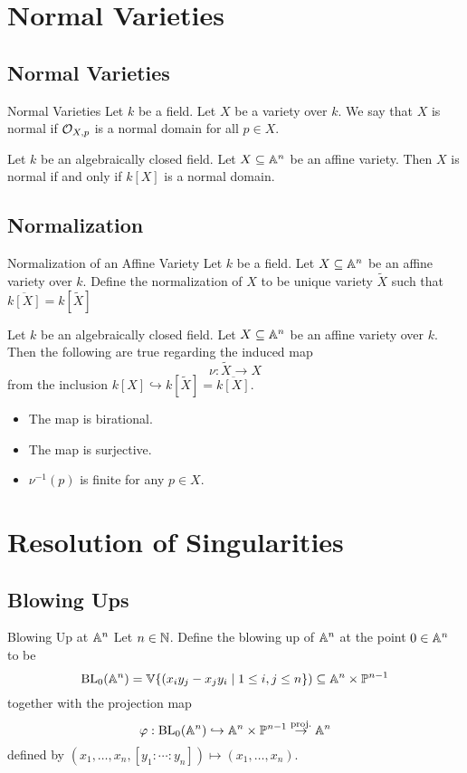 \documentclass[a4paper]{article}
\begin{document}
\pagebreak
\section{Normal Varieties}
\subsection{Normal Varieties}
\begin{defn}{Normal Varieties}{} Let $k$ be a field. Let $X$ be a variety over $k$. We say that $X$ is normal if $\mathcal{O}_{X,p}$ is a normal domain for all $p\in X$. 
\end{defn}

\begin{prp}{}{} Let $k$ be an algebraically closed field. Let $X\subseteq\mathbb{A}^n$ be an affine variety. Then $X$ is normal if and only if $k[X]$ is a normal domain. 
\end{prp}

\subsection{Normalization}
\begin{defn}{Normalization of an Affine Variety}{} Let $k$ be a field. Let $X\subseteq\mathbb{A}^n$ be an affine variety over $k$. Define the normalization of $X$ to be unique variety $\widetilde{X}$ such that $\overline{k[X]}=k[\widetilde{X}]$
\end{defn}

\begin{prp}{}{} Let $k$ be an algebraically closed field. Let $X\subseteq\mathbb{A}^n$ be an affine variety over $k$. Then the following are true regarding the induced map $$\nu:\widetilde{X}\to X$$ from the inclusion $k[X]\hookrightarrow k[\widetilde{X}]=\overline{k[X]}$. 
\begin{itemize}
\item The map is birational. 
\item The map is surjective. 
\item $\nu^{-1}(p)$ is finite for any $p\in X$. 
\end{itemize}
\end{prp}

\pagebreak
\section{Resolution of Singularities}
\subsection{Blowing Ups}
\begin{defn}{Blowing Up at $\mathbb{A}^n$}{} Let $n\in\mathbb{N}$. Define the blowing up of $\mathbb{A}^n$ at the point $0\in\mathbb{A}^n$ to be $$\text{BL}_0(\mathbb{A}^n)=\mathbb{V}\{(x_iy_j-x_jy_i\;|\;1\leq i,j\leq n\})\subseteq\mathbb{A}^n\times\mathbb{P}^{n-1}$$ together with the projection map $$\varphi:\text{BL}_0(\mathbb{A}^n)\hookrightarrow\mathbb{A}^n\times\mathbb{P}^{n-1}\overset{\text{proj.}}{\rightarrow}\mathbb{A}^n$$ defined by $(x_1,\dots,x_n,[y_1:\cdots:y_n])\mapsto(x_1,\dots,x_n)$. 
\end{defn}
\end{document}
